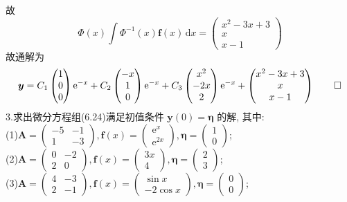 \documentclass[titlepage,11pt,a4paper,twoside]{report}
\makeatletter
\newcommand\diff{\,\mathrm{d}}
\newcommand\e{\mathrm{e}}
\newcommand\bmitPhi{\bm{\varPhi}}
\newenvironment{solve}{\par
	\pushQED{\qed}%
	\normalfont \topsep1\p@\@plus6\p@\relax
	\trivlist
	\item\relax
	{\hspace*{\parindent}{\heiti 解}\@addpunct{:}}\hspace\labelsep\ignorespaces
}{%
	\popQED\endtrivlist\@endpefalse
}
\makeatother
\begin{document}
\begin{solve}
故\[\bmitPhi(x)\int\bmitPhi^{-1}(x)\bm{f}(x)\diff x=\begin{pmatrix}x^2-3x+3\\x\\x-1\end{pmatrix}\]
故通解为
\[\bm{y}=C_1\begin{pmatrix}1\\0\\0\end{pmatrix}\e^{-x}+C_2\begin{pmatrix}-x\\1\\0\end{pmatrix}\e^{-x}+C_3\begin{pmatrix}x^2\\-2x\\2\end{pmatrix}\e^{-x}+\begin{pmatrix}x^2-3x+3\\x\\x-1\end{pmatrix}\qedhere\]
\end{solve}
3.求出微分方程组(6.24)满足初值条件 $\bm{y}(0)=\bm{\eta}$ 的解, 其中:\\
(1)$\bm{A}=\begin{pmatrix}-5&-1\\1&-3\end{pmatrix},\bm{f}(x)=\begin{pmatrix}\e^x\\\e^{2x}\end{pmatrix},\bm{\eta}=\begin{pmatrix}1\\0\end{pmatrix}$;\\
(2)$\bm{A}=\begin{pmatrix}0&-2\\2&0\end{pmatrix},\bm{f}(x)=\begin{pmatrix}3x\\4\end{pmatrix},\bm{\eta}=\begin{pmatrix}2\\3\end{pmatrix}$;\\
(3)$\bm{A}=\begin{pmatrix}4&-3\\2&-1\end{pmatrix},\bm{f}(x)=\begin{pmatrix}\sin x\\-2\cos x\end{pmatrix},\bm{\eta}=\begin{pmatrix}0\\0\end{pmatrix}$;\\
\end{document}
